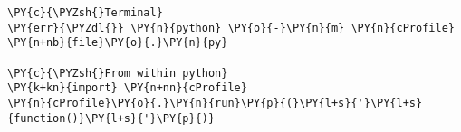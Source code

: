 \begin{Verbatim}[commandchars=\\\{\}]
\PY{c}{\PYZsh{}Terminal}
\PY{err}{\PYZdl{}} \PY{n}{python} \PY{o}{-}\PY{n}{m} \PY{n}{cProfile} \PY{n+nb}{file}\PY{o}{.}\PY{n}{py}

\PY{c}{\PYZsh{}From within python}
\PY{k+kn}{import} \PY{n+nn}{cProfile}
\PY{n}{cProfile}\PY{o}{.}\PY{n}{run}\PY{p}{(}\PY{l+s}{'}\PY{l+s}{function()}\PY{l+s}{'}\PY{p}{)}
\end{Verbatim}

